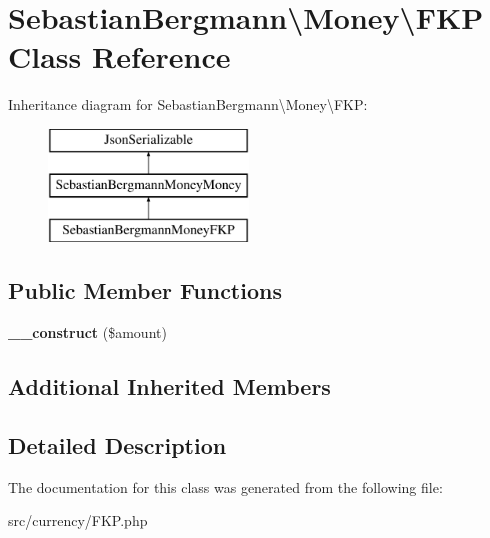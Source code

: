 \hypertarget{classSebastianBergmann_1_1Money_1_1FKP}{}\section{Sebastian\+Bergmann\textbackslash{}Money\textbackslash{}F\+K\+P Class Reference}
\label{classSebastianBergmann_1_1Money_1_1FKP}
Inheritance diagram for Sebastian\+Bergmann\textbackslash{}Money\textbackslash{}F\+K\+P\+:\begin{figure}[H]
\begin{center}
\leavevmode
\includegraphics[height=3.000000cm]{classSebastianBergmann_1_1Money_1_1FKP}
\end{center}
\end{figure}
\subsection*{Public Member Functions}
\begin{DoxyCompactItemize}
\item 
\hypertarget{classSebastianBergmann_1_1Money_1_1FKP_a5d206fd0be7804c28ec541f645b9fba2}{}{\bfseries \+\_\+\+\_\+construct} (\$amount)\label{classSebastianBergmann_1_1Money_1_1FKP_a5d206fd0be7804c28ec541f645b9fba2}

\end{DoxyCompactItemize}
\subsection*{Additional Inherited Members}


\subsection{Detailed Description}


The documentation for this class was generated from the following file\+:\begin{DoxyCompactItemize}
\item 
src/currency/F\+K\+P.\+php\end{DoxyCompactItemize}

